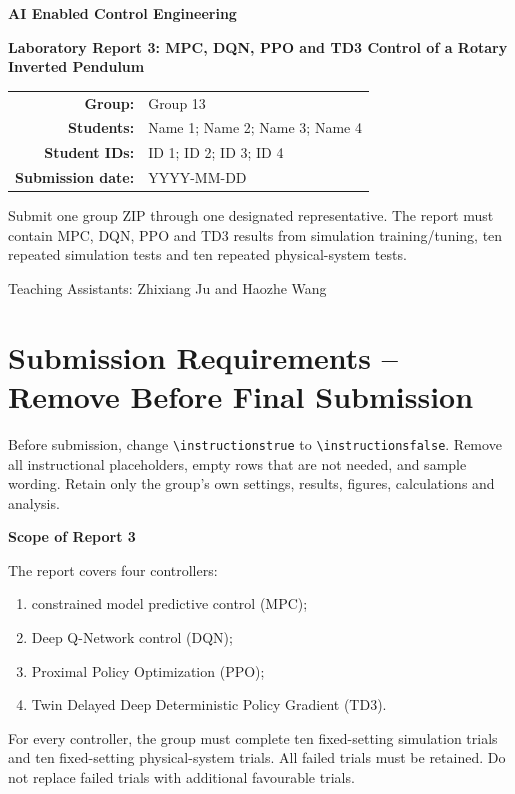 \documentclass[11pt,a4paper]{article}
\newcommand{\CourseName}{AI Enabled Control Engineering}
\newcommand{\ReportTitle}{Laboratory Report 3: MPC, DQN, PPO and TD3 Control of a Rotary Inverted Pendulum}
\newcommand{\GroupNumber}{Group 13}
\newcommand{\StudentNames}{Name 1; Name 2; Name 3; Name 4}
\newcommand{\StudentIDs}{ID 1; ID 2; ID 3; ID 4}
\newcommand{\SubmissionDate}{YYYY-MM-DD}
\newif\ifinstructions
\begin{document}
\begin{titlepage}
\centering
\vspace*{12mm}
{\Large\bfseries \CourseName\par}
\vspace{11mm}
{\huge\bfseries\color{TAblue} \ReportTitle\par}
\vspace{15mm}
\begin{tabular}{>{\bfseries}rl}
Group: & \GroupNumber\\[2mm]
Students: & \StudentNames\\[2mm]
Student IDs: & \StudentIDs\\[2mm]
Submission date: & \SubmissionDate
\end{tabular}
\vfill
\begin{tcolorbox}[width=0.90\linewidth,colback=TAgray,colframe=TAblue]
\centering
Submit one group ZIP through one designated representative. The report must
contain MPC, DQN, PPO and TD3 results from simulation training/tuning,
ten repeated simulation tests and ten repeated physical-system tests.
\end{tcolorbox}
\vspace{7mm}
{\small Teaching Assistants: Zhixiang Ju and Haozhe Wang}
\end{titlepage}

\ifinstructions
\section*{Submission Requirements -- Remove Before Final Submission}

\begin{warningbox}
Before submission, change \verb|\instructionstrue| to
\verb|\instructionsfalse|. Remove all instructional placeholders, empty rows
that are not needed, and sample wording. Retain only the group's own settings,
results, figures, calculations and analysis.
\end{warningbox}

\begin{requirementbox}
\textbf{Scope of Report 3}

The report covers four controllers:
\begin{enumerate}
  \item constrained model predictive control (MPC);
  \item Deep Q-Network control (DQN);
  \item Proximal Policy Optimization (PPO);
  \item Twin Delayed Deep Deterministic Policy Gradient (TD3).
\end{enumerate}
For every controller, the group must complete ten fixed-setting simulation
trials and ten fixed-setting physical-system trials. All failed trials must be
retained. Do not replace failed trials with additional favourable trials.
\end{requirementbox}
\end{document}
